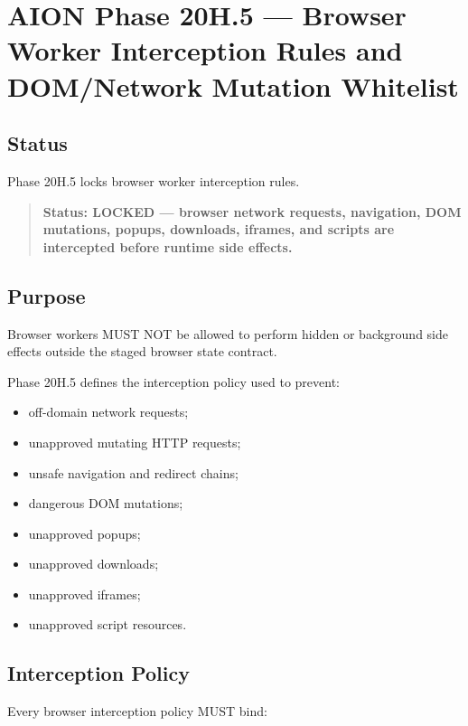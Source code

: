 \section{AION Phase 20H.5 --- Browser Worker Interception Rules and DOM/Network Mutation Whitelist}
\label{sec:aion-phase20h5-browser-worker-interception-rules}

\subsection{Status}

Phase 20H.5 locks browser worker interception rules.

\begin{quote}
\textbf{Status: LOCKED --- browser network requests, navigation, DOM mutations, popups, downloads, iframes, and scripts are intercepted before runtime side effects.}
\end{quote}

\subsection{Purpose}

Browser workers MUST NOT be allowed to perform hidden or background side effects outside the staged browser state contract.

Phase 20H.5 defines the interception policy used to prevent:

\begin{itemize}
  \item off-domain network requests;
  \item unapproved mutating HTTP requests;
  \item unsafe navigation and redirect chains;
  \item dangerous DOM mutations;
  \item unapproved popups;
  \item unapproved downloads;
  \item unapproved iframes;
  \item unapproved script resources.
\end{itemize}

\subsection{Interception Policy}

Every browser interception policy MUST bind:

